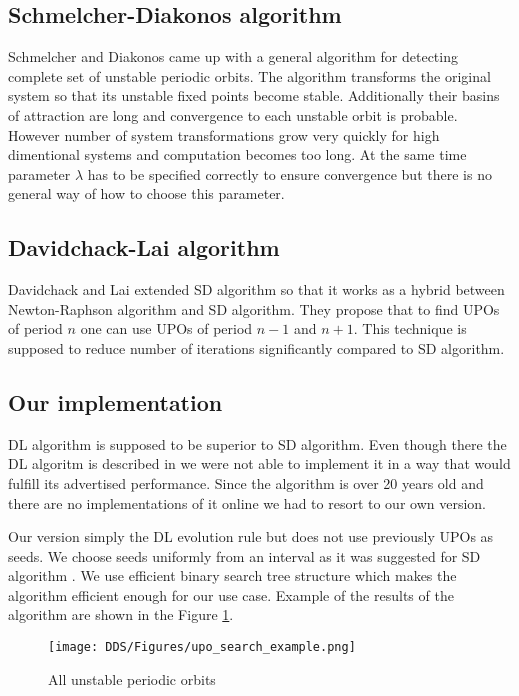 \subsection{Schmelcher-Diakonos algorithm}
Schmelcher and Diakonos came up with a general algorithm for detecting complete set of unstable periodic orbits.
The algorithm transforms the original system so that its unstable fixed points become stable.
Additionally their basins of attraction are long and convergence to each unstable orbit is probable.
However number of system transformations grow very quickly for high dimentional systems and computation becomes too long.
At the same time parameter $\lambda$ has to be specified correctly to ensure convergence but there is no general way of how to choose this parameter. \cite{Schmelcher1997}

\subsection{Davidchack-Lai algorithm}
Davidchack and Lai extended SD algorithm so that it works as a hybrid between Newton-Raphson algorithm and SD algorithm.
They propose that to find UPOs of period $n$ one can use UPOs of period $n-1$ and $n+1$.
This technique is supposed to reduce number of iterations significantly compared to SD algorithm. \cite{Davidchack1999}

\subsection{Our implementation}
DL algorithm is supposed to be superior to SD algorithm.
Even though there the DL algoritm is described in \cite{Davidchack1999,Davidchack2001,Klebanoff2001} we were not able to implement it in a way that would fulfill its advertised performance.
Since the algorithm is over 20 years old and there are no implementations of it online we had to resort to our own version.
\par
Our version simply the DL evolution rule but does not use previously UPOs as seeds.
We choose seeds uniformly from an interval as it was suggested for SD algorithm \cite{Schmelcher1997}.
We use efficient binary search tree structure which makes the algorithm efficient enough for our use case.
Example of the results of the algorithm are shown in the Figure \ref{fig:upo_search_example}.

\begin{figure}[!h]
    \centering
    \texttt{[image: DDS/Figures/upo\_search\_example.png]}
    \caption{All unstable periodic orbits}
    \label{fig:upo_search_example}
\end{figure}


